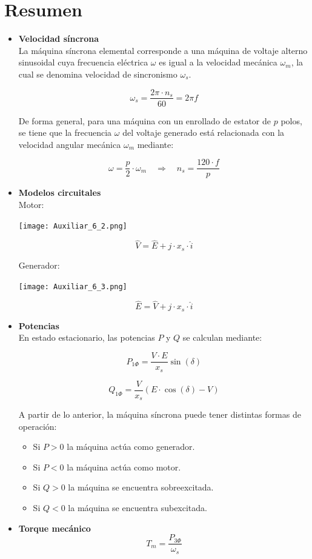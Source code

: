 \documentclass[
  11pt,
  letterpaper,
   addpoints,
   answers
  ]{exam}
\begin{document}
\section{Resumen}
\begin{itemize}
    \item \textbf{Velocidad síncrona} \\
    La máquina síncrona elemental corresponde a una máquina de voltaje alterno sinusoidal cuya frecuencia eléctrica $\omega$ es igual a la velocidad mecánica $\omega_m$, la cual se denomina velocidad de sincronismo $\omega_s$.
    
    \[
    \omega_s = \frac{2\pi \cdot n_s}{60} = 2\pi f
    \]
    
    De forma general, para una máquina con un enrollado de estator de $p$ polos, se tiene que la frecuencia $\omega$ del voltaje generado está relacionada con la velocidad angular mecánica $\omega_m$ mediante:
    
    \[
    \omega = \frac{p}{2} \cdot \omega_m \quad \Rightarrow \quad n_s = \frac{120 \cdot f}{p}
    \]
    
    \item \textbf{Modelos circuitales} \\
    Motor:
    \begin{center}
        \texttt{[image: Auxiliar\_6\_2.png]}
    \end{center}
    
    \[
    \hat{V} = \hat{E} + j \cdot x_s \cdot \hat{i}
    \]
    
    Generador:
    \begin{center}
            \texttt{[image: Auxiliar\_6\_3.png]}
    \end{center}
    
    \[
    \hat{E} = \hat{V} + j \cdot x_s \cdot \hat{i}
    \]
    
    \item \textbf{Potencias} \\
    En estado estacionario, las potencias $P$ y $Q$ se calculan mediante:
    
    \[
    P_{1\Phi} = \frac{V \cdot E}{x_s} \sin(\delta)
    \]
    
    \[
    Q_{1\Phi} = \frac{V}{x_s} \left( E \cdot \cos(\delta) - V \right)
    \]
    
    A partir de lo anterior, la máquina síncrona puede tener distintas formas de operación:
    
    \begin{itemize}
        \item Si $P > 0$ la máquina actúa como generador.
        \item Si $P < 0$ la máquina actúa como motor.
        \item Si $Q > 0$ la máquina se encuentra sobreexcitada.
        \item Si $Q < 0$ la máquina se encuentra subexcitada.
    \end{itemize}
    
    \item \textbf{Torque mecánico} \\
    \[
    T_m = \frac{P_{3\Phi}}{\omega_s}
    \]
    
\end{itemize}
\end{document}
